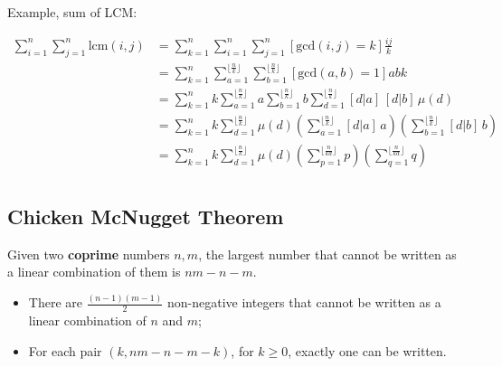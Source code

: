 Example, sum of LCM:

\begin{align*}
    \sum_{i = 1}^n \sum_{j = 1}^n \text{lcm}(i, j) &=
    \sum_{k = 1}^n\sum_{i=1}^n\sum_{j=1}^n [\text{gcd}(i, j) = k] \frac{ij}{k} \\
    &= \sum_{k = 1}^n\sum_{a=1}^{\lfloor \frac{n}{k} \rfloor}\sum_{b=1}^{\lfloor \frac{n}{k} \rfloor} [\text{gcd}(a, b) = 1] abk \\
    &= \sum_{k = 1}^n k \sum_{a=1}^{\lfloor \frac{n}{k} \rfloor} a \sum_{b=1}^{\lfloor \frac{n}{k} \rfloor} b \sum_{d=1}^{\lfloor \frac{n}{k} \rfloor}[d|a]\,[d|b] \, \mu(d) \\
    &= \sum_{k = 1}^n k \sum_{d=1}^{\lfloor \frac{n}{k} \rfloor}  \mu(d) \left(\sum_{a=1}^{\lfloor \frac{n}{k} \rfloor} [d|a] \, a\right) \left(\sum_{b=1}^{\lfloor \frac{n}{k} \rfloor} [d|b] \, b\right) \\
    &= \sum_{k = 1}^n k \sum_{d=1}^{\lfloor \frac{n}{k} \rfloor}  \mu(d) \left(\sum_{p=1}^{\lfloor \frac{n}{kd} \rfloor} p\right) \left(\sum_{q=1}^{\lfloor \frac{n}{kd} \rfloor} q\right) \\
\end{align*}

\subsection{Chicken McNugget Theorem}

Given two \textbf{coprime} numbers $n, m$, the largest number that cannot be written as a linear combination of them is $nm - n - m$.

\begin{itemize}
    \item There are $\frac{(n-1)(m-1)}{2}$ non-negative integers that cannot be written as a linear combination of $n$ and $m$;
    \item For each pair $(k, nm - n - m - k)$, for $k \geq 0$, exactly one can be written.
\end{itemize}

